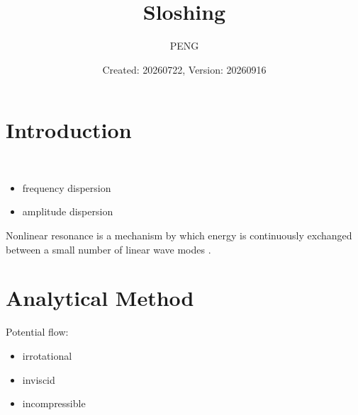 \documentclass{article}
\title{Sloshing}
\author{PENG}
\date{Created: 20260722, Version: 20260916}
\begin{document}
\maketitle
\tableofcontents

\section{Introduction}
\begin{definition}[dispersion]~
    \begin{itemize}
        \item frequency dispersion
        \item amplitude dispersion
    \end{itemize}
\end{definition}

\begin{definition}
    Nonlinear resonance is a mechanism by which energy is continuously exchanged between a small number of linear wave modes \cite{DUREY_2023_RESONANT_TRIAD_INTERACTIONS_OF_GRAVITY_WAVES_IN_CYLINDRICAL_BASINS}.
\end{definition}

\section{Analytical Method}
\begin{assumption}
    Potential flow:
    \begin{itemize}
        \item irrotational
        \item inviscid
        \item incompressible
    \end{itemize}
\end{assumption}
\end{document}
